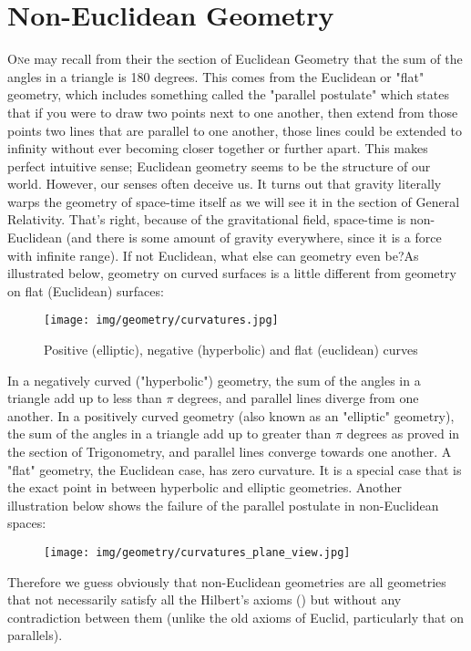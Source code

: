 	\newpage
	\thispagestyle{empty}
	\mbox{}	
	\section{Non-Euclidean Geometry}\label{non-euclidean geometry}
	\lettrine[lines=4]{\color{BrickRed}O}ne may recall from their the section of Euclidean Geometry that the sum of the angles in a triangle is 180 degrees. This comes from the Euclidean or "flat" geometry, which includes something called the "parallel postulate" which states that if you were to draw two points next to one another, then extend from those points two lines that are parallel to one another, those lines could be extended to infinity without ever becoming closer together or further apart. This makes perfect intuitive sense; Euclidean geometry seems to be the structure of our world. However, our senses often deceive us. It turns out that gravity literally warps the geometry of space-time itself as we will see it in the section of General Relativity. That's right, because of the gravitational field, space-time is non-Euclidean (and there is some amount of gravity everywhere, since it is a force with infinite range). If not Euclidean, what else can geometry even be?As illustrated below, geometry on curved surfaces is a little different from geometry on flat (Euclidean) surfaces:
	\begin{figure}[H]
		\centering
		\texttt{[image: img/geometry/curvatures.jpg]}
		\caption{Positive (elliptic), negative (hyperbolic) and flat (euclidean) curves}
	\end{figure}
	
	In a negatively curved ("hyperbolic") geometry, the sum of the angles in a triangle add up to less than $\pi$ degrees, and parallel lines diverge from one another. In a positively curved geometry (also known as an "elliptic" geometry), the sum of the angles in a triangle add up to greater than $\pi$ degrees as proved in the section of Trigonometry, and parallel lines converge towards one another. A "flat" geometry, the Euclidean case, has zero curvature. It is a special case that is the exact point in between hyperbolic and elliptic geometries. Another illustration below shows the failure of the parallel postulate in non-Euclidean spaces:
	\begin{figure}[H]
		\centering
		\texttt{[image: img/geometry/curvatures\_plane\_view.jpg]}
	\end{figure}
	Therefore we guess obviously that non-Euclidean geometries are all geometries that not necessarily satisfy all the Hilbert's axioms () but without any contradiction between them (unlike the old axioms of Euclid, particularly that on parallels).\\
	
